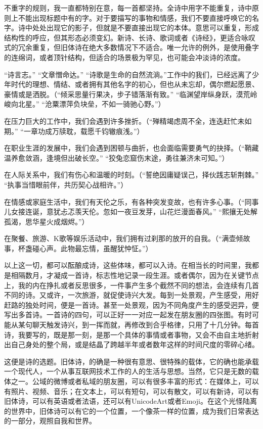\documentclass{article}
\begin{document}
不重字的规则，我一直都特别在意，每一首都坚持。全诗中用字不能重复，诗中原则上不能出现标题中有的字。对于要描写的事物和情感，我们不要直接呼唤它的名字。诗中处处出现它的影子，但就是不要直接出现它的本体。意思可以重复，形成结构性的呼应，但其形态必须变幻。新诗、长诗、歌词或者《诗经》，更适合咏叹式的冗余重复，但旧体诗在绝大多数情况下不适合。唯一允许的例外，是使用叠字的连绵词，或者顶针结构，但适合的场景极为罕见，也可能会冲淡诗的浓度。

“诗言志。” “文章憎命达。” “诗歌是生命的自然流淌。”工作中的我们，已经远离了少年时代的理想、情结、或者拥有其他名字的初心，但也从未忘却，偶尔燃起愿景、豪情或是洒脱。（“倾采思量行果决，步子错落渐有致。” “临渊望岸纵身跃，漠荒岭峻向北星。” “沧粟漂萍负块垒，不如一骑驰心野。”）

在压力巨大的工作中，我们会遇到许多挫折。（“殚精竭虑周不全，连迭赶忙未如期。” “一章功成万牍耽，载愿千钧辙痕浅。”）

在职业生涯的发展中，我们会遇到困顿与曲折，也会面临需要勇气的抉择。（“鞘藏温养愈敛涵，逢境但出破长空。” “狡兔恋窟伤末途，勇往兼济未可知。”）

在人际关系中，我们有伤心和温暖的时刻。（“誓绝因庸疑误己，择伙践志斩荆棘。” “执事当惜眼前伴，共历契心战相许。”）

在情感或家庭生活中，我们有天伦之乐，有各种突发变故，也有许多心事。（“同事儿女接连诞，意犹忐忑羡天伦。忽如一夜豆发芽，山花烂漫面春风。” “熙攘无处解孤渴，思华星火成烟烬。”）

在聚餐、旅游、K歌等娱乐活动中，我们拥有过刹那的放开的自我。（“满壶倾故事，杯盏碰心声。此物最忘情，虽醒犹忡怔。”）

以上这一切，都可以酝酿成诗，这些体味，都可以入诗。在相当长的时间里，我都是相隔数月，才凝成一首诗，标志性地记录一段生涯。或者偶尔，因为在关键节点上，我的内在挣扎或者反思很多，一件事产生多个截然不同的想法，会连续有几首不同的诗。又或许，一次旅游，就促使诗兴大发。每到一处景观，产生感受，用好赶路的独处时间，便是一首诗。甚至一处景观，因为不同角度产生的感受迥异，便写出多首诗。一首诗的四句，可以正好一一对应一起发在朋友圈的四张图。有时可能从某句聊天触发诗兴，到一挥而就，再修改到合乎格律，只用了十几分钟。每首诗，我要写的，既是那一刻，是那一个具体的事情或者事物，又会不由自主地折射出自己身处的整个局，或是结晶了跨越半年或者数年这样的时间尺度的零碎心绪。

这便是诗的选题。旧体诗，的确是一种很有意思、很特殊的载体，它的确也能承载一个现代人，一个从事互联网技术工作的人的生活与思想。当然，它只是无数的载体之一。公域的微博或者私域的朋友圈，可以有很多丰富的形式：在媒体上，可以有照片、视频、音乐；在文本上，可以有短句，可以有散文，可以有新诗，可以有旧体诗，可以有英语或者法语，还可以有UnicodeArt或者Emoji。在这个光怪陆离的世界中，旧体诗可以有它的一个位置，一个像茶一样的位置，成为我们日常表达的一部分，观照自我和世界。
\end{document}
